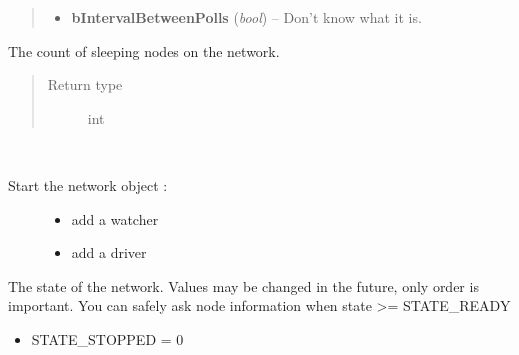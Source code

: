 \documentclass[letterpaper,10pt,english]{sphinxmanual}
\begin{document}
\begin{fulllineitems}
\begin{fulllineitems}
\begin{quote}
\begin{description}
\begin{itemize}
\item {} 
\textbf{bIntervalBetweenPolls} (\emph{bool}) -- Don't know what it is.

\end{itemize}

\end{description}\end{quote}

\end{fulllineitems}


\begin{fulllineitems}
\label{network:openzwave.network.ZWaveNetwork.sleeping_nodes_count}
The count of sleeping nodes on the network.
\begin{quote}\begin{description}
\item[{Return type}] \leavevmode
int

\end{description}\end{quote}

\end{fulllineitems}


\begin{fulllineitems}
\label{network:openzwave.network.ZWaveNetwork.start}~\begin{description}
\item[{Start the network object :}] \leavevmode\begin{itemize}
\item {} 
add a watcher

\item {} 
add a driver

\end{itemize}

\end{description}

\end{fulllineitems}


\begin{fulllineitems}
\label{network:openzwave.network.ZWaveNetwork.state}
The state of the network. Values may be changed in the future,
only order is important.
You can safely ask node information when state \textgreater{}= STATE\_READY
\begin{itemize}
\item {} 
STATE\_STOPPED = 0


\end{itemize}
\end{fulllineitems}
\end{fulllineitems}
\end{document}

